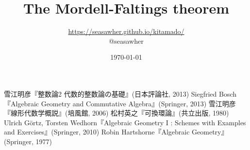 \documentclass[10pt]{jsarticle}
\begin{document}
\title{The Mordell-Faltings theorem}
\author{\url{https://seasawher.github.io/kitamado/} \\ @seasawher}
\date{\today}
\maketitle



\newpage



\newpage

\begin{thebibliography}{1}
 雪江明彦『整数論2 代数的整数論の基礎』(日本評論社, 2013)
 Siegfried Bosch『Algebraic Geometry and Commutative Algebra』(Springer, 2013)
 雪江明彦『線形代数学概説』(培風館, 2006)
   松村英之『可換環論』(共立出版, 1980)
   Ulrich G\"{o}rtz, Torsten Wedhorn『Algebraic Geometry I : Schemes  with Examples and Exercises』(Springer, 2010)
   Robin Hartshorne『Algebraic Geometry』(Springer, 1977)
\end{thebibliography}
\end{document}
